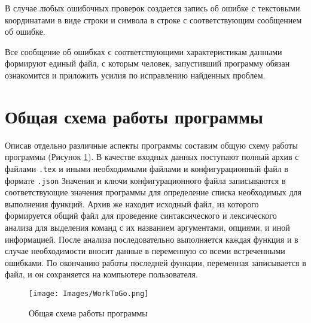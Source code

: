     В случае любых ошибочных проверок создается запись об ошибке с текстовыми координатами в виде строки и символа в строке с соответствующим сообщением об ошибке.

 Все сообщение об ошибках с соответствующими характеристикам данными формируют единый файл, с которым человек, запустивший программу обязан ознакомится и приложить усилия по исправлению найденных проблем.

\section{Общая схема работы программы}

    Описав отдельно различные аспекты программы составим общую схему работы программы (Рисунок \ref{fig:3}). В качестве входных данных поступают полный архив с файлами \verb|.tex| и иными необходимыми файлами и конфигурационный файл в формате \verb|.json| Значения и ключи  конфигурационного файла записываются в соответствующие значения программы для определение списка необходимых для выполнения функций. Архив же находит исходный файл, из которого формируется общий файл для проведение синтаксического и лексического анализа для выделения команд с их названием аргументами, опциями, и иной информацией. После анализа последовательно выполняется каждая функция и в случае необходимости вносит данные в переменную со всеми встреченными ошибками. По окончанию работы последней функции, переменная записывается в файл, и он сохраняется на компьютере пользователя.

   \begin{figure}[!h]
        \center
        \texttt{[image: Images/WorkToGo.png]}
        \caption{Общая схема работы программы}
        \label{fig:3}
    \end{figure}
